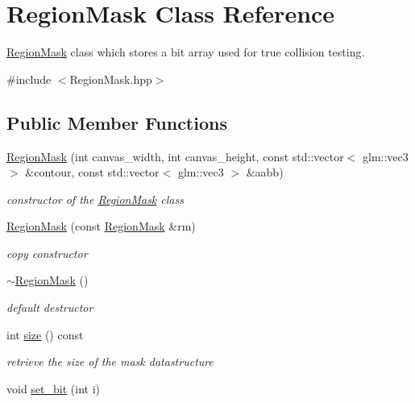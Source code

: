 \hypertarget{class_region_mask}{}\section{Region\+Mask Class Reference}
\label{class_region_mask}


\mbox{\hyperlink{class_region_mask}{Region\+Mask}} class which stores a bit array used for true collision testing.  




{\ttfamily \#include $<$Region\+Mask.\+hpp$>$}

\subsection*{Public Member Functions}
\begin{DoxyCompactItemize}
\item 
\mbox{\hyperlink{class_region_mask_a5387c57890b36b1d79e9a0af4c6a4b1f}{Region\+Mask}} (int canvas\+\_\+width, int canvas\+\_\+height, const std\+::vector$<$ glm\+::vec3 $>$ \&contour, const std\+::vector$<$ glm\+::vec3 $>$ \&aabb)
\begin{DoxyCompactList}\small\item\em constructor of the \mbox{\hyperlink{class_region_mask}{Region\+Mask}} class \end{DoxyCompactList}\item 
\mbox{\hyperlink{class_region_mask_ae86aeb4505cdefe0e21bb67512404bdf}{Region\+Mask}} (const \mbox{\hyperlink{class_region_mask}{Region\+Mask}} \&rm)
\begin{DoxyCompactList}\small\item\em copy constructor \end{DoxyCompactList}\item 
\mbox{\hyperlink{class_region_mask_a519ebc9fe842c0c3270b41ed924cbffc}{$\sim$\+Region\+Mask}} ()
\begin{DoxyCompactList}\small\item\em default destructor \end{DoxyCompactList}\item 
int \mbox{\hyperlink{class_region_mask_aace9314c3879fbcb5d4bce19a2f4e8cf}{size}} () const
\begin{DoxyCompactList}\small\item\em retrieve the size of the mask datastructure \end{DoxyCompactList}\item 
void \mbox{\hyperlink{class_region_mask_a497298f97da4812e923a0b8e29ab9d23}{set\+\_\+bit}} (int i)

\end{DoxyCompactItemize}
